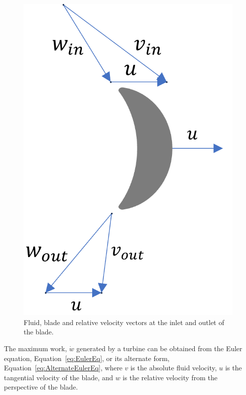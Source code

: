         \begin{figure}[H]
            \centering
            \includegraphics{Content/PowGen/Figures/Turbine/VelocityTrianglesSchematic.png}
            \caption{Fluid, blade and relative velocity vectors at the inlet and outlet of the blade.}
            \label{fig:prosim_litrev_blade_velocity}
        \end{figure}
    
        The maximum work, \(\Dot{w}\) generated by a turbine can be obtained from the Euler equation, Equation~\ref{eq:EulerEq}, or its alternate form, Equation~\ref{eq:AlternateEulerEq}, where \(v\) is the absolute fluid velocity, \(u\) is the tangential velocity of the blade, and \(w\) is the relative velocity from the perspective of the blade.
        
